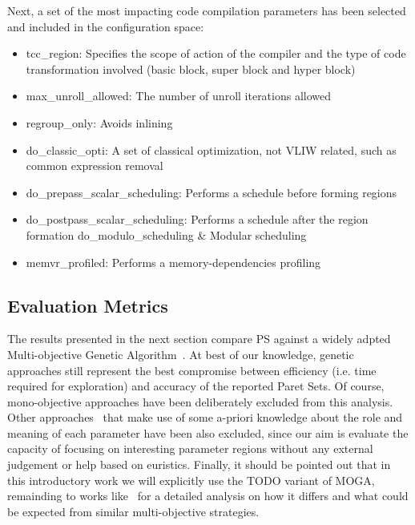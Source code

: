 \begin{itemize}
Next, a set of the most impacting code compilation parameters has been
selected and included in the configuration space:
\begin{itemize}
\item{tcc\_region}: Specifies the scope of action of the compiler and the type
of code transformation involved (basic block, super block and hyper
block) 
\item {max\_unroll\_allowed}: The number of unroll iterations allowed
\item{regroup\_only}: Avoids inlining 
\item{do\_classic\_opti}: A set of classical optimization, not VLIW related,
such as common expression removal 
\item{do\_prepass\_scalar\_scheduling}: Performs a schedule before
forming regions 
\item{do\_postpass\_scalar\_scheduling}: Performs a schedule after the region formation 
do\_modulo\_scheduling & Modular scheduling 
\item{memvr\_profiled}: Performs a memory-dependencies profiling 
\end{itemize}

\subsection{Evaluation Metrics}

The results presented in the next section compare PS against a widely
adpted Multi-objective Genetic Algorithm~\cite{}. At best of our
knowledge, genetic approaches
still represent the best compromise between efficiency (i.e. time
required for exploration) and accuracy of the reported Paret Sets. Of
course, mono-objective approaches have been
deliberately excluded from this analysis. Other
approaches~\cite{dep} that make use of some a-priori knowledge about the
role and meaning of each parameter have been also excluded, since our
aim is evaluate the capacity of focusing on interesting
parameter regions without any external judgement or help based on
euristics.  Finally, it should be pointed
out that in this introductory work we will explicitly use the TODO
variant of MOGA, remainding to works like~\cite{} for a detailed
analysis on how it differs and what could be expected from similar multi-objective strategies.


\end{itemize}
